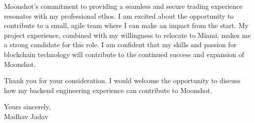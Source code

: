\documentclass[10pt,letterpaper]{article}
\begin{document}
Moonshot's commitment to providing a seamless and secure trading experience resonates with my professional ethos. I am excited about the opportunity to contribute to a small, agile team where I can make an impact from the start. My project experience, combined with my willingness to relocate to Miami, makes me a strong candidate for this role. I am confident that my skills and passion for blockchain technology will contribute to the continued success and expansion of Moonshot.

Thank you for your consideration. I would welcome the opportunity to discuss how my backend engineering experience can contribute to Moonshot.

Yours sincerely,\\[8pt]
Madhav Jadav
\end{document}
